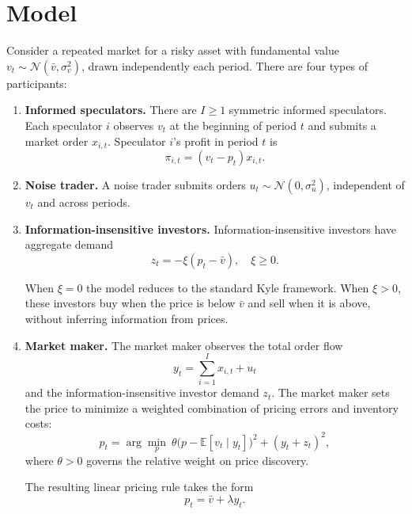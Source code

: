 \documentclass[11pt]{article}
\begin{document}
\section{Model}

Consider a repeated market for a risky asset with fundamental value 
$v_t \sim \mathcal{N}(\bar{v}, \sigma_v^2)$, drawn independently each period. 
There are four types of participants:

\begin{enumerate}
    \item \textbf{Informed speculators.} There are $I \geq 1$ symmetric informed speculators. 
    Each speculator $i$ observes $v_t$ at the beginning of period $t$ and submits a market order $x_{i,t}$. 
    Speculator $i$'s profit in period $t$ is
    \[
    \boxed{\pi_{i,t} = (v_t - p_t)x_{i,t}}.
    \]

    \item \textbf{Noise trader.} A noise trader submits orders 
    $u_t \sim \mathcal{N}(0, \sigma_u^2)$, independent of $v_t$ and across periods.

    \item \textbf{Information-insensitive investors.} Information-insensitive investors have aggregate demand
    \begin{equation}
        \boxed{z_t = -\xi (p_t - \bar{v}), \quad \xi \geq 0}.
    \end{equation}
    
    When $\xi = 0$ the model reduces to the standard Kyle framework. 
    When $\xi > 0$, these investors buy when the price is below $\bar{v}$ 
    and sell when it is above, without inferring information from prices.

    \item \textbf{Market maker.} The market maker observes the total order flow 
    \[
    \boxed{y_t = \sum_{i=1}^I x_{i,t} + u_t}
    \]
    and the information-insensitive investor demand $z_t$. 
    The market maker sets the price to minimize 
    a weighted combination of pricing errors and inventory costs:
    \begin{equation}
        \boxed{p_t = \arg\min_p \ \theta \big(p - \mathbb{E}[v_t \mid y_t]\big)^2 + (y_t + z_t)^2},
        \label{mm_opt}
    \end{equation}
    where $\theta > 0$ governs the relative weight on price discovery.
    
    The resulting linear pricing rule takes the form
    \begin{equation}
        \boxed{p_t = \bar{v} + \lambda y_t}.
        \label{pricingrule}
    \end{equation}
\end{enumerate}
\end{document}
